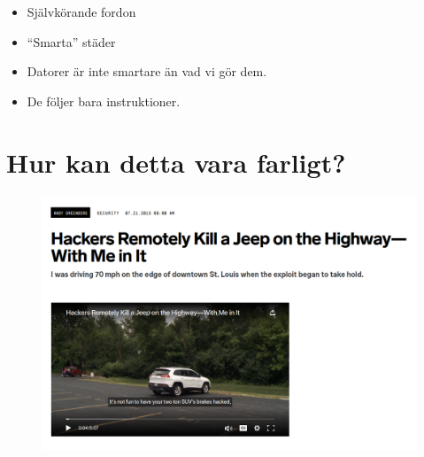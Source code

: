\begin{frame}
  \begin{example}
    \begin{itemize}
      \item Självkörande fordon
      \item \enquote{Smarta} städer
    \end{itemize}
  \end{example}

  \pause

  \begin{remark}
    \begin{itemize}
      \item Datorer är inte smartare än vad vi gör dem.
      \item De följer bara instruktioner.
    \end{itemize}
  \end{remark}
\end{frame}


\section{Hur kan detta vara farligt?}





\begin{frame}
  \begin{figure}
    \includegraphics[width=\columnwidth]{fig/hacking-jeep.png}
  \end{figure}
\end{frame}


